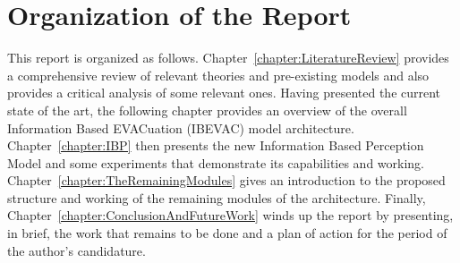 \section{Organization of the Report}
\label{Intro:Organisation}
 This report is organized as follows. Chapter~\ref{chapter:LiteratureReview} provides a comprehensive review of relevant theories and pre-existing models and also provides a critical analysis of some relevant ones. Having presented the current state of the art, the following chapter provides an overview of the overall Information Based EVACuation (IBEVAC) model architecture. Chapter~\ref{chapter:IBP} then presents the new Information Based Perception Model and some experiments that demonstrate its capabilities and working. Chapter~\ref{chapter:TheRemainingModules} gives an introduction to the proposed structure and working of the remaining modules of the architecture. Finally, Chapter~\ref{chapter:ConclusionAndFutureWork} winds up the report by presenting, in brief, the work that remains to be done and a plan of action for the period of the author's candidature.



